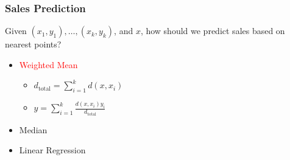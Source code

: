 \begin{frame}[fragile]
    \frametitle{Sales Prediction}
    Given $(x_1, y_1), \ldots, (x_k, y_k)$, and $x$, how should we predict sales based on nearest points?
    \begin{itemize}
        \item \textcolor{red}{Weighted Mean}
        \begin{itemize}
            \item $d_{\text{total}} = \sum_{i = 1}^k d(x, x_i)$
            \item $y = \sum_{i = 1}^{k} \frac{d(x, x_i) y_i}{d_{\text{total}}}$
        \end{itemize}
        \item Median
        \item Linear Regression
    \end{itemize}
\end{frame}

